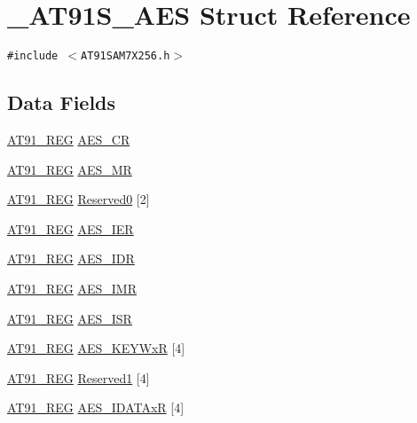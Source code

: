\hypertarget{struct__AT91S__AES}{
\section{\_\-AT91S\_\-AES Struct Reference}
\label{struct__AT91S__AES}
}
{\tt \#include $<$AT91SAM7X256.h$>$}

\subsection*{Data Fields}
\begin{CompactItemize}
\item 
\hyperlink{AT91SAM7X256_8h_712ad5a1ac1bd02f3e95a7526c283ce1}{AT91\_\-REG} \hyperlink{struct__AT91S__AES_b3ba921e79e8215004773e86e4da0d9b}{AES\_\-CR}
\item 
\hyperlink{AT91SAM7X256_8h_712ad5a1ac1bd02f3e95a7526c283ce1}{AT91\_\-REG} \hyperlink{struct__AT91S__AES_9aef7b71cde64f668f417acd5315db00}{AES\_\-MR}
\item 
\hyperlink{AT91SAM7X256_8h_712ad5a1ac1bd02f3e95a7526c283ce1}{AT91\_\-REG} \hyperlink{struct__AT91S__AES_38e2b518a9e2e58cbce066c6834b24bd}{Reserved0} \mbox{[}2\mbox{]}
\item 
\hyperlink{AT91SAM7X256_8h_712ad5a1ac1bd02f3e95a7526c283ce1}{AT91\_\-REG} \hyperlink{struct__AT91S__AES_a34c05570476531c96390ff93049ad16}{AES\_\-IER}
\item 
\hyperlink{AT91SAM7X256_8h_712ad5a1ac1bd02f3e95a7526c283ce1}{AT91\_\-REG} \hyperlink{struct__AT91S__AES_90641cdaa7cb555907f56ceaebba1140}{AES\_\-IDR}
\item 
\hyperlink{AT91SAM7X256_8h_712ad5a1ac1bd02f3e95a7526c283ce1}{AT91\_\-REG} \hyperlink{struct__AT91S__AES_0e6b99ee7321d011bc6f3c7347849270}{AES\_\-IMR}
\item 
\hyperlink{AT91SAM7X256_8h_712ad5a1ac1bd02f3e95a7526c283ce1}{AT91\_\-REG} \hyperlink{struct__AT91S__AES_072ce6f604d1f9d50f3fcaa145ec7d1e}{AES\_\-ISR}
\item 
\hyperlink{AT91SAM7X256_8h_712ad5a1ac1bd02f3e95a7526c283ce1}{AT91\_\-REG} \hyperlink{struct__AT91S__AES_17f870b3397d6bc35dcd325b83d9ff01}{AES\_\-KEYWxR} \mbox{[}4\mbox{]}
\item 
\hyperlink{AT91SAM7X256_8h_712ad5a1ac1bd02f3e95a7526c283ce1}{AT91\_\-REG} \hyperlink{struct__AT91S__AES_38cd57de3b6876915902d00038ce97cd}{Reserved1} \mbox{[}4\mbox{]}
\item 
\hyperlink{AT91SAM7X256_8h_712ad5a1ac1bd02f3e95a7526c283ce1}{AT91\_\-REG} \hyperlink{struct__AT91S__AES_e8dd530691ad5f7e714c06d4f7af5acc}{AES\_\-IDATAxR} \mbox{[}4\mbox{]}

\end{CompactItemize}
